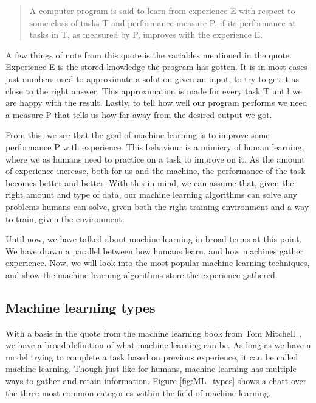 \begin{quote}
 A computer program is said to learn from experience E with respect to some class of tasks T and performance measure P, if its performance at tasks in T, as measured by P, improves with the experience E.

\end{quote} 
\label{ML}


\vspace{10px}
A few things of note from this quote is the variables mentioned in the quote. Experience E is the stored knowledge the program has gotten. It is in most cases just numbers used to approximate a solution given an input, to try to get it as close to the right answer. This approximation is made for every task T until we are happy with the result.
Lastly, to tell how well our program performs we need a measure P that tells us how far away from the desired output we got.
   
From this, we see that the goal of machine learning is to improve some performance P with experience. This behaviour is a mimicry of human learning, where we as humans need to practice on a task to improve on it.
As the amount of experience increase, both for us and the machine, the performance of the task becomes better and better. With this in mind, we can assume that, given the right amount and type of data, our machine learning algorithms can solve any problems humans can solve, given both the right training environment and a way to train, given the environment.

Until now, we have talked about machine learning in broad terms at this point. We have drawn a parallel between how humans learn, and how machines gather experience.  Now, we will look into the most popular machine learning techniques, and show the machine learning algorithms store the experience gathered.
 
\subsection{Machine learning types}
With a basis in the quote from the machine learning book from Tom Mitchell~\cite{MitchellTomM1997Ml}, we have a broad definition of what machine learning can be.
As long as we have a model trying to complete a task based on previous experience, it can be called machine learning. Though just like for humans, machine learning has multiple ways to gather and retain information.
Figure \ref{fig:ML_types} shows a chart over the three most common categories within the field of machine learning. 


